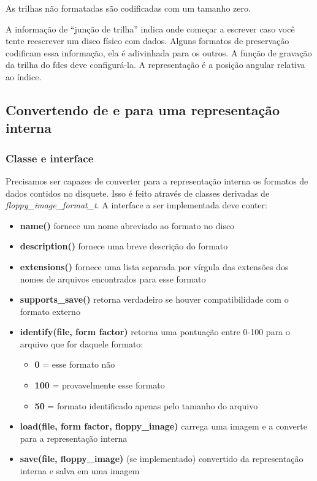 \documentclass[letterpaper,10pt,brazil]{sphinxmanual}
\begin{document}
As trilhas não formatadas são codificadas com um tamanho zero.

A informação de ``junção de trilha'' indica onde começar a escrever caso
você tente reescrever um disco físico com dados. Alguns formatos de
preservação codificam essa informação, ela é adivinhada para os outros.
A função de gravação da trilha do fdcs deve configurá-la.
A representação é a posição angular relativa ao índice.


\subsection{Convertendo de e para uma representação interna}
\label{techspecs/floppy:convertendo-de-e-para-uma-representacao-interna}

\subsubsection{Classe e interface}
\label{techspecs/floppy:classe-e-interface}
Precisamos ser capazes de converter para a representação interna os
formatos de dados contidos no disquete. Isso é feito através de classes
derivadas de \emph{floppy\_image\_format\_t}. A interface a ser implementada
deve conter:
\begin{itemize}
\item {} 
\textbf{name()} fornece um nome abreviado ao formato no disco

\item {} 
\textbf{description()} fornece uma breve descrição do formato

\item {} 
\textbf{extensions()} fornece uma lista separada por vírgula das extensões
dos nomes de arquivos encontrados para esse formato

\item {} 
\textbf{supports\_save()} retorna verdadeiro se houver compatibilidade com o
formato externo

\item {} 
\textbf{identify(file, form factor)} retorna uma pontuação entre 0-100 para
o arquivo que for daquele formato:
\begin{itemize}
\item {} 
\textbf{0}       = esse formato não

\item {} 
\textbf{100}     = provavelmente esse formato

\item {} 
\textbf{50}      = formato identificado apenas pelo tamanho do arquivo

\end{itemize}

\item {} 
\textbf{load(file, form factor, floppy\_image)} carrega uma imagem e a
converte para a representação interna

\item {} 
\textbf{save(file, floppy\_image)} (se implementado) convertido da
representação interna e salva em uma imagem

\end{itemize}
\end{document}
